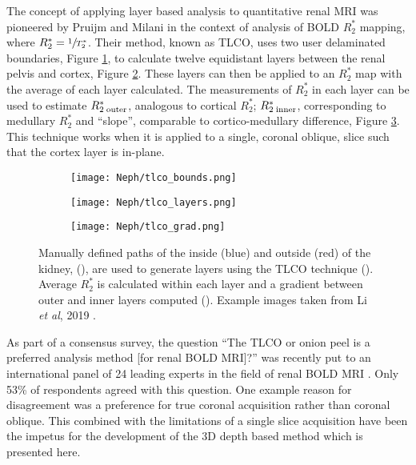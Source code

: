 The concept of applying layer based analysis to quantitative renal \ac{MRI} was pioneered by Pruijm and Milani \cite{piskunowicz_new_2015, milani_reduction_2017, pruijm_blood_2017, li_renal_2019} in the context of analysis of \ac{BOLD} $R_2^*$ mapping, where $R_2^*=\sfrac{1}{T_2^*}$. Their method, known as \ac{TLCO}, uses two user delaminated boundaries, Figure \ref{fig:ex_tlco_bounds}, to calculate twelve equidistant layers between the renal pelvis and cortex, Figure \ref{fig:ex_tlco_layers}. These layers can then be applied to an $R_2^*$ map with the average of each layer calculated. The measurements of $R_2^*$ in each layer can be used to estimate $R_{2\;\textup{outer}}^*$, analogous to cortical $R_2^*$; $R_{2\;\textup{inner}}^*$, corresponding to medullary $R_2^*$ and ``slope'', comparable to  cortico-medullary difference, Figure \ref{fig:ex_tlco_grad}. This technique works when it is applied to a single, coronal oblique, slice such that the cortex layer is in-plane.

\begin{figure}[H]
	\centering
	\begin{subfigure}[c]{0.23\textwidth}
		\centering
		\texttt{[image: Neph/tlco\_bounds.png]}
		\caption{}
		\label{fig:ex_tlco_bounds}
	\end{subfigure}
	\hfill
	\begin{subfigure}[c]{0.23\textwidth}
		\centering
		\texttt{[image: Neph/tlco\_layers.png]}
		\caption{}
		\label{fig:ex_tlco_layers}
	\end{subfigure}
	\hfill
	\begin{subfigure}[c]{0.47\textwidth}
		\centering
		\texttt{[image: Neph/tlco\_grad.png]}
		\caption{}
		\label{fig:ex_tlco_grad}
	\end{subfigure}
	\caption{Manually defined paths of the inside (blue) and outside (red) of the kidney, (), are used to generate layers using the \ac{TLCO} technique (). Average $R_2^*$ is calculated within each layer and a gradient between outer and inner layers computed (). Example images taken from Li \textit{et al}, 2019 \cite{li_renal_2019}.}
	\label{fig:ex_tlco}
\end{figure}

As part of a consensus survey, the question ``The \ac{TLCO} or onion peel is a preferred analysis method [for renal \ac{BOLD} \ac{MRI}]?'' was recently put to an international panel of 24 leading experts in the field of renal \ac{BOLD} \ac{MRI} \cite{bane_consensus-based_2020}. Only 53\% of respondents agreed with this question. One example reason for disagreement was a preference for true coronal acquisition rather than coronal oblique. This combined with the limitations of a single slice acquisition have been the impetus for the development of the 3D depth based method which is presented here.

